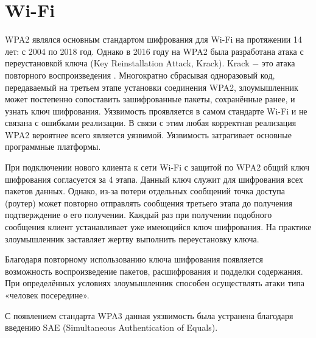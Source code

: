 	\section{Wi-Fi}
	WPA2 являлся основным стандартом шифрования для Wi-Fi на протяжении 14 лет: с 2004 по 2018 год.
	Однако в 2016 году на WPA2 была разработана атака с переустановкой ключа (Key Reinstallation Attack, Krack).
	Krack $-$ это атака повторного воспроизведения \cite{cve-2017-13077}. Многократно сбрасывая одноразовый код, передаваемый 
	на третьем этапе установки соединения WPA2, злоумышленник может постепенно сопоставить зашифрованные 
	пакеты, сохранённые ранее, и узнать ключ шифрования.
	Уязвимость проявляется в самом стандарте Wi-Fi и не связана с ошибками реализации. В связи с этим любая
	корректная реализация WPA2 вероятнее всего является уязвимой. Уязвимость затрагивает основные 
	программные платформы.
	
	При подключении нового клиента к сети Wi-Fi с защитой по WPA2 общий ключ шифрования согласуется 
	за 4 этапа. Данный ключ служит для шифрования всех пакетов данных. Однако, из-за потери отдельных 
	сообщений точка доступа (роутер) может повторно отправлять сообщения третьего этапа до получения 
	подтверждение о его получении. Каждый раз при получении подобного сообщения клиент устанавливает 
	уже имеющийся ключ шифрования. На практике злоумышленник заставляет жертву выполнить переустановку
	ключа.
	
	Благодаря повторному использованию ключа шифрования появляется возможность воспроизведение пакетов, 
	расшифрования и подделки содержания. При определённых условиях злоумышленник способен осуществлять 
	атаки типа «человек посередине».
	
	С появлением стандарта WPA3 данная уязвимость была устранена благодаря введению SAE (Simultaneous 
	Authentication of Equals).
	